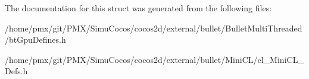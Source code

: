 The documentation for this struct was generated from the following files\+:\begin{DoxyCompactItemize}
\item 
/home/pmx/git/\+P\+M\+X/\+Simu\+Cocos/cocos2d/external/bullet/\+Bullet\+Multi\+Threaded/bt\+Gpu\+Defines.\+h\item 
/home/pmx/git/\+P\+M\+X/\+Simu\+Cocos/cocos2d/external/bullet/\+Mini\+C\+L/cl\+\_\+\+Mini\+C\+L\+\_\+\+Defs.\+h\end{DoxyCompactItemize}
